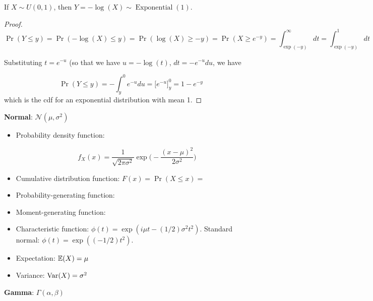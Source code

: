 \begin{proposition}\label{prob.log.unif.exp}If \(X \sim U(0, 1)\), then \(Y = - \log(X) \sim \operatorname{Exponential}(1)\). 
\end{proposition}

\begin{proof}
\[
\Pr(Y \leq y) = \Pr(- \log(X) \leq y) = \Pr( \log(X) \geq -y)  = \Pr(X \geq e^{-y}) = \int_{\exp(-y)}^\infty dt = \int_{\exp(-y)}^1 dt
\]

Substituting \(t = e^{-u}\) (so that we have \(u = -\log(t)\), \(dt = -e^{-u} du\), we have

\[
\Pr(Y \leq y) =  -\int_{y}^{0}  e^{-u} du = \big[e^{-u} \big]_y^0 = 1 - e^{- y}
\]
which is the cdf for an exponential distribution with mean 1.
\end{proof}

\textbf{Normal}: \(\mathcal{N}(\mu, \sigma^2)\)

\begin{itemize}

\item Probability density function:

\[
f_X(x) = \frac{1}{\sqrt{2 \pi \sigma^2}} \exp \bigg( - \frac{(x-\mu)^2}{2 \sigma^2}\bigg)
\]

\item Cumulative distribution function: \(F(x) = \Pr(X \leq x) = \)

\item Probability-generating function:

\item Moment-generating function:

\item Characteristic function: \(\phi(t) = \exp(i\mu t - (1/2) \sigma^2t^2)\). Standard normal: \(\phi(t) = \exp((-1/2)t^2)\).

\item Expectation: \(\E(X) = \mu\)

\item Variance: \(\Var(X) = \sigma^2 \)

\end{itemize}

\textbf{Gamma}: \(\Gamma(\alpha, \beta)\) 


